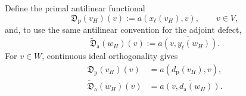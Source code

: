 Define the primal antilinear functional
\begin{equation}
\label{eq:total-primal-functional}
  \mathfrak D_{\mathrm p}(v_H)(v)
  :=a(x_\ell(v_H),v),
  \qquad v\in V,
\end{equation}
and, to use the same antilinear convention for the adjoint defect,
\begin{equation}
\label{eq:total-adjoint-functional}
  \widetilde{\mathfrak D}_{\mathrm a}(w_H)(v)
  :=\overline{a(v,y_\ell(w_H))}.
\end{equation}
For $v\in W$, continuous ideal orthogonality gives
\begin{align}
  \mathfrak D_{\mathrm p}(v_H)(v)
  &=a(d_{\mathrm p}(v_H),v),
  \label{eq:total-primal-identity}\\
  \widetilde{\mathfrak D}_{\mathrm a}(w_H)(v)
  &=\overline{a(v,d_{\mathrm a}(w_H))}.
  \label{eq:total-adjoint-identity}
\end{align}

